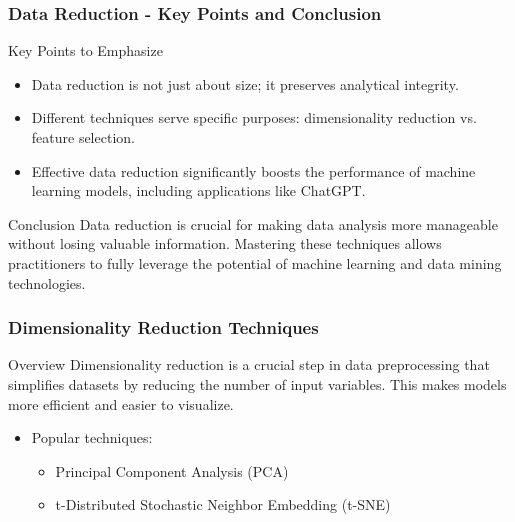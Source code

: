 \documentclass[aspectratio=169]{beamer}
\begin{document}
\begin{frame}[fragile]
    \frametitle{Data Reduction - Key Points and Conclusion}
    \begin{block}{Key Points to Emphasize}
        \begin{itemize}
            \item Data reduction is not just about size; it preserves analytical integrity.
            \item Different techniques serve specific purposes: dimensionality reduction vs. feature selection.
            \item Effective data reduction significantly boosts the performance of machine learning models, including applications like ChatGPT.
        \end{itemize}
    \end{block}

    \begin{block}{Conclusion}
        Data reduction is crucial for making data analysis more manageable without losing valuable information. Mastering these techniques allows practitioners to fully leverage the potential of machine learning and data mining technologies.
    \end{block}
\end{frame}

\begin{frame}[fragile]
    \frametitle{Dimensionality Reduction Techniques}
    \begin{block}{Overview}
        Dimensionality reduction is a crucial step in data preprocessing that simplifies datasets by reducing the number of input variables. This makes models more efficient and easier to visualize. 
        \begin{itemize}
            \item Popular techniques: 
                \begin{itemize}
                    \item Principal Component Analysis (PCA)
                    \item t-Distributed Stochastic Neighbor Embedding (t-SNE)
                \end{itemize}
        \end{itemize}
    \end{block}
\end{frame}
\end{document}
